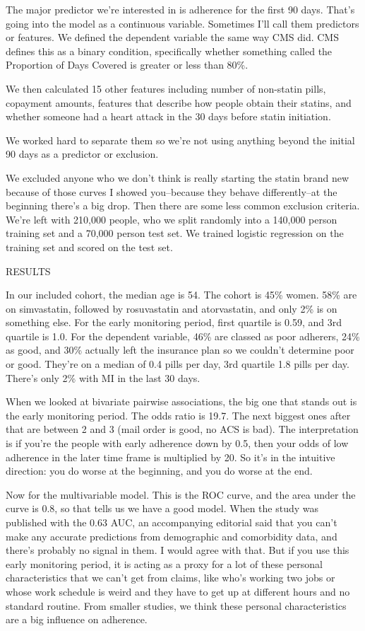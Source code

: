 \documentclass[12pt]{report}
\begin{document}
\begin{large}
The major predictor we're interested in is adherence for the first 90
days. That's going into the model as a continuous variable. Sometimes
I'll call them predictors or features. We defined the dependent
variable the same way CMS did. CMS defines this as a binary condition,
specifically whether something called the Proportion of Days Covered
is greater or less than 80\%.

We then calculated 15 other features including number of non-statin
pills, copayment amounts, features that describe how people obtain
their statins, and whether someone had a heart attack in the 30 days
before statin initiation.

We worked hard to separate them so we're not using anything beyond the
initial 90 days as a predictor or exclusion.

We excluded anyone who we don't think is really starting the statin
brand new because of those curves I showed you--because they behave
differently--at the beginning there's a big drop. Then there are some
less common exclusion criteria. We're left with 210,000 people, who we
split randomly into a 140,000 person training set and a 70,000 person
test set. We trained logistic regression on the training set and
scored on the test set.

RESULTS

In our included cohort, the median age is 54. The cohort is 45\% women.
58\% are on simvastatin, followed by rosuvastatin and atorvastatin, and
only 2\% is on something else. For the early monitoring period, first
quartile is 0.59, and 3rd quartile is 1.0. For the dependent variable,
46\% are classed as poor adherers, 24\% as good, and 30\% actually left
the insurance plan so we couldn't determine poor or good. They're on a
median of 0.4 pills per day, 3rd quartile 1.8 pills per day. There's
only 2\% with MI in the last 30 days.

When we looked at bivariate pairwise associations, the big one that
stands out is the early monitoring period. The odds ratio is 19.7. The
next biggest ones after that are between 2 and 3 (mail order is good,
no ACS is bad). The interpretation is if you're the people
with early adherence down by 0.5, then your odds of low adherence in
the later time frame is multiplied by 20. So it's in the intuitive
direction: you do worse at the beginning, and you do worse at the end.

Now for the multivariable model. This is the ROC curve, and the area
under the curve is 0.8, so that tells us we have a good model. When
the study was published with the 0.63 AUC, an accompanying editorial
said that you can't make any accurate predictions from demographic and
comorbidity data, and there's probably no signal in them. I would
agree with that. But if you use this early monitoring period, it is
acting as a proxy for a lot of these personal characteristics that we
can't get from claims, like who's working two jobs or whose work
schedule is weird and they have to get up at different hours and no
standard routine. From smaller studies, we think these personal
characteristics are a big influence on adherence.


\end{large}
\end{document}
